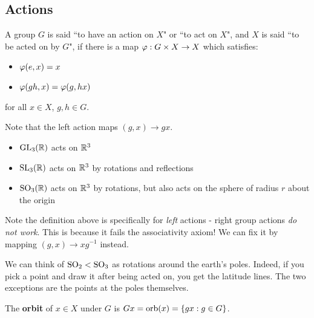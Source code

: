 \subsection{Actions}


\begin{defn}
    A group $ G $ is said ``to have an action on $ X $" or ``to act on $ X $",
    and $ X $ is said ``to be acted on by $ G $",
    if there is a map $ \operatorname{\varphi}: G \times X \rightarrow X $ which satisfies:
    \begin{itemize}
        \item $ \operatorname{\varphi}(e, x) = x $
        \item $ \operatorname{\varphi}(gh, x) = \operatorname{\varphi}(g, hx) $
    \end{itemize}
    for all $ x \in X $, $ g, h \in G $.
\end{defn}

Note that the left action maps $ (g, x) \rightarrow gx $.

\begin{xmp}[source=Primary Source Material]
    \begin{itemize}
        \item $ \operatorname{GL}_{3}(\mathbb{R}) $ acts on $ \mathbb{R}^{3} $
        \item $ \operatorname{SL}_{3}(\mathbb{R}) $ acts on $ \mathbb{R}^{3} $ by rotations and reflections
        \item $ \operatorname{SO}_{3}(\mathbb{R}) $ acts on $ \mathbb{R}^{3} $ by rotations,
            but also acts on the sphere of radius $ r $ about the origin
    \end{itemize}
\end{xmp}

Note the definition above is specifically for \textit{left} actions -
right group actions \textit{do not work}.
This is because it fails the associativity axiom!
We can fix it by mapping $ (g, x) \rightarrow xg^{-1} $ instead.

\begin{xmp}[source=Primary Source Material]
    We can think of $ \operatorname{SO}_{2} < \operatorname{SO}_{3} $ as rotations around the earth's poles. \vsp
    Indeed, if you pick a point and draw it after being acted on, you get the latitude lines.
    The two exceptions are the points at the poles themselves.
\end{xmp}

\begin{defn}
    The \textbf{orbit} of $ x \in X $ under $ G $ is $ Gx = \textrm{orb}(x) = \left\{{gx : g \in G}\right\} $.
\end{defn}

